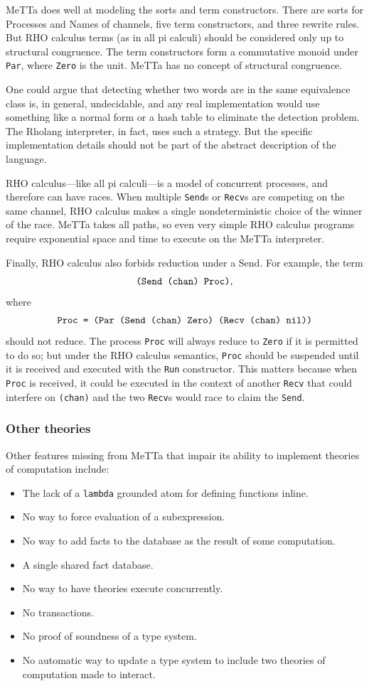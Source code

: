 \documentclass{article}
\begin{document}
\noindent MeTTa does well at modeling the sorts and term constructors.  There are sorts for Processes and Names of channels, five term constructors, and three rewrite rules.  But RHO calculus terms (as in all pi calculi) should be considered only up to structural congruence.  The term constructors form a commutative monoid under \verb+Par+, where \verb+Zero+ is the unit.  MeTTa has no concept of structural congruence.

One could argue that detecting whether two words are in the same equivalence class is, in general, undecidable, and any real implementation would use something like a normal form or a hash table to eliminate the detection problem.  The Rholang interpreter, in fact, uses such a strategy.  But the specific implementation details should not be part of the abstract description of the language.

RHO calculus---like all pi calculi---is a model of concurrent processes, and therefore can have races.  When multiple \verb+Send+s or \verb+Recv+s are competing on the same channel, RHO calculus makes a single nondeterministic choice of the winner of the race.  MeTTa takes all paths, so even very simple RHO calculus programs require exponential space and time to execute on the MeTTa interpreter.

Finally, RHO calculus also forbids reduction under a Send.  For example, the term 
\[\mbox{\tt(Send (chan) Proc)},\]
where
\[\mbox{\tt Proc = (Par (Send (chan) Zero) (Recv (chan) nil))}\]
should not reduce.  The process \verb+Proc+ will always reduce to \verb+Zero+ if it is permitted to do so; but under the RHO calculus semantics, \verb+Proc+ should be suspended until it is received and executed with the \verb+Run+ constructor.  This matters because when \verb+Proc+ is received, it could be executed in the context of another \verb+Recv+ that could interfere on \verb+(chan)+ and the two \verb+Recv+s would race to claim the \verb+Send+.

\subsubsection{Other theories}

Other features missing from MeTTa that impair its ability to implement theories of computation include:
\begin{itemize}
    \item The lack of a \verb+lambda+ grounded atom for defining functions inline.
    \item No way to force evaluation of a subexpression.
    \item No way to add facts to the database as the result of some computation.
    \item A single shared fact database.
    \item No way to have theories execute concurrently.
    \item No transactions.
    \item No proof of soundness of a type system.
    \item No automatic way to update a type system to include two theories of computation made to interact.
\end{itemize}
\end{document}
